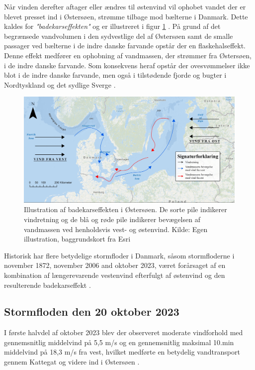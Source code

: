 Når vinden derefter aftager eller ændres til østenvind vil ophobet vandet der er blevet presset ind i Østersøen, strømme tilbage mod bælterne i Danmark. Dette kaldes for \textit{"badekarseffekten"} og er illustreret i figur \ref{Figur: Bathtub effect} \citep{kystdirektoratet_stormfloder, egusphere_baltic}. På grund af det begrænsede vandvolumen i den sydvestlige del af Østersøen samt de smalle passager ved bælterne i de indre danske farvande opstår der en flaskehalseffekt. Denne effekt medfører en ophobning af vandmassen, der strømmer fra Østersøen, i de indre danske farvande. Som konsekvens heraf opstår der ovesvømmelser ikke blot i de indre danske farvande, men også i tilstødende fjorde og bugter i Nordtyskland og det sydlige Sverge \citep{egusphere_baltic, kiesel_brief_2024}.
\begin{figure}[H]
    \centering
    \includegraphics[width=0.8\linewidth]{images/teori/bathtub effect graphics.jpg}
    \caption{Illustration af badekarseffekten i Østersøen. De sorte pile indikerer vindretning og de blå og røde pile indikerer bevægelsen af vandmassen ved henholdsvis vest- og østenvind. Kilde: Egen illustration, baggrundskort fra Esri}
    \label{Figur: Bathtub effect}
\end{figure}

Historisk har flere betydelige stormfloder i Danmark, såsom stormfloderne i november 1872, november 2006 and oktober 2023, været forårsaget af en kombination af længerevarende vestenvind efterfulgt af østenvind og den resulterende badekarseffekt \citep{kystdirektoratet_stormfloder}.

\subsection{Stormfloden den 20 oktober 2023} \label{Afsnit: Stormfloden den 20 oktober 2023}
I første halvdel af oktober 2023 blev der observeret moderate vindforhold med gennemsnitlig middelvind på 5,5 m/s og en gennemsnitlig maksimal 10.min middelvind på 18,3 m/s fra vest, hvilket medførte en betydelig vandtransport gennem Kattegat og videre ind i Østersøen \citep{dmi_vejrarkiv}. \\

